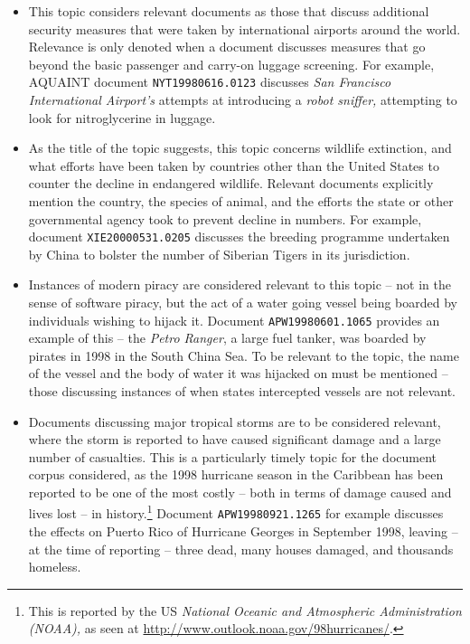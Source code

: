 \begin{itemize}
    
    \item[]{ This topic considers relevant documents as those that discuss additional security measures that were taken by international airports around the world. Relevance is only denoted when a document discusses measures that go beyond the basic passenger and carry-on luggage screening. For example, AQUAINT document \texttt{NYT19980616.0123} discusses \emph{San Francisco International Airport's} attempts at introducing a \emph{robot sniffer,} attempting to look for nitroglycerine in luggage.}
    
    \item[]{ As the title of the topic suggests, this topic concerns wildlife extinction, and what efforts have been taken by countries other than the United States to counter the decline in endangered wildlife. Relevant documents explicitly mention the country, the species of animal, and the efforts the state or other governmental agency took to prevent decline in numbers. For example, document \texttt{XIE20000531.0205} discusses the breeding programme undertaken by China to bolster the number of Siberian Tigers in its jurisdiction.}
    
    \item[]{ Instances of modern piracy are considered relevant to this topic -- not in the sense of software piracy, but the act of a water going vessel being boarded by individuals wishing to hijack it. Document \texttt{APW19980601.1065} provides an example of this -- the \emph{Petro Ranger}, a large fuel tanker, was boarded by pirates in 1998 in the South China Sea. To be relevant to the topic, the name of the vessel and the body of water it was hijacked on must be mentioned -- those discussing instances of when states intercepted vessels are not relevant.}
    
    \item[]{ Documents discussing major tropical storms are to be considered relevant, where the storm is reported to have caused significant damage and a large number of casualties. This is a particularly timely topic for the document corpus considered, as the 1998 hurricane season in the Caribbean has been reported to be one of the most costly -- both in terms of damage caused and lives lost -- in history.\footnote{This is reported by the US \emph{National Oceanic and Atmospheric Administration (NOAA),} as seen at \url{http://www.outlook.noaa.gov/98hurricanes/}. } Document \texttt{APW19980921.1265} for example discusses the effects on Puerto Rico of Hurricane Georges in September 1998, leaving -- at the time of reporting -- three dead, many houses damaged, and thousands homeless.}
    

\end{itemize}
